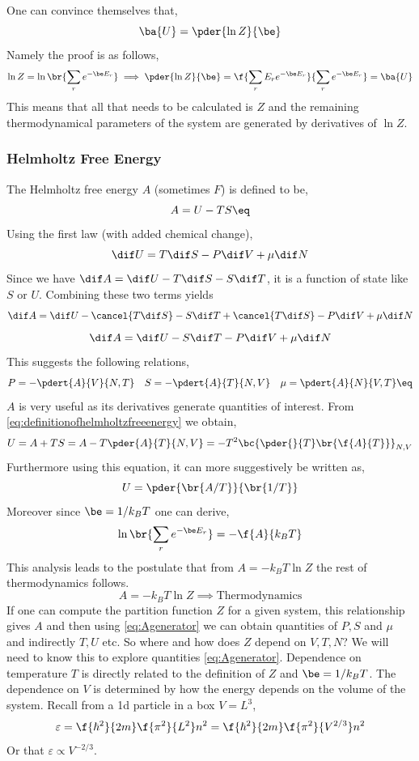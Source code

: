 \documentclass{article}
\begin{document}
One can convince themselves that,
\[ \ba{U} =\pder{\ln Z}{\be} \]
Namely the proof is as follows,
\[ \ln Z = \ln\br{\sum_r e^{-\be E_r}} \implies \pder{\ln Z}{\be} = \f{\sum_r E_r e^{-\be E_r}}{\sum_r e^{-\be E_r}} = \ba{U} \]
This means that all that needs to be calculated is $Z$ and the remaining thermodynamical parameters of the system are generated by derivatives of $\ln Z$.

\subsubsection{Helmholtz Free Energy}

The Helmholtz free energy $A$ (sometimes $F$) is defined to be,
\[ A = U - TS \eq \label{eq:definitionofhelmholtzfreeenergy}\]
Using the first law (with added chemical change),
\[ \dif U = T \dif S - P \dif V + \mu \dif N \]
Since we have $\dif A = \dif U - T \dif S - S \dif T$, it is a function of state like $S$ or $U$. Combining these two terms yields
\[ \dif A = \dif U - \cancel{T \dif S} - S \dif T + \cancel{T \dif S} - P \dif V + \mu \dif N\]
\[ \dif A = \dif U - S \dif T - P \dif V + \mu \dif N\]
This suggests the following relations,
\[ P = -\pdert{A}{V}{N,T} \quad S = -\pdert{A}{T}{N,V} \quad \mu = \pdert{A}{N}{V,T} \eq \label{eq:Agenerator} \]
$A$ is very useful as its derivatives generate quantities of interest. From \eqref{eq:definitionofhelmholtzfreeenergy} we obtain,
\[ U = A + TS = A - T \pder{A}{T}{N,V} = - T^2 \bc{\pder{}{T} \br{\f{A}{T}}}_{N,V} \]
Furthermore using this equation, it can more suggestively be written as,
\[ U = \pder{\br{A/T}}{\br{1/T}} \]
Moreover since $\be = 1/ k_B T$ one can derive,
\[ \ln \br{\sum_r e^{-\be E_r}} = - \f{A}{k_B T} \]
This analysis leads to the postulate that from $A = - k_B T \ln Z$ the rest of thermodynamics follows.
\[ A = - k_B T \ln Z \implies \text{Thermodynamics} \]
If one can compute the partition function $Z$ for a given system, this relationship gives $A$ and then using \eqref{eq:Agenerator} we can obtain quantities of $P, S$ and $\mu$ and indirectly $T, U$ etc.
So where and how does $Z$ depend on $V,T,N$? We will need to know this to explore quantities \eqref{eq:Agenerator}. Dependence on temperature $T$ is directly related to the definition of $Z$ and $\be = 1/ k_B T$. The dependence on $V$ is determined by how the energy depends on the volume of the system. Recall from a 1d particle in a box $V = L^3$,
\[ \varepsilon = \f{\hbar^2}{2 m} \f{\pi^2}{L^2} n^2 = \f{\hbar^2}{2 m} \f{\pi^2}{V^{2/3}} n^2 \]
Or that $\varepsilon \propto V^{-2/3}$.
\end{document}
